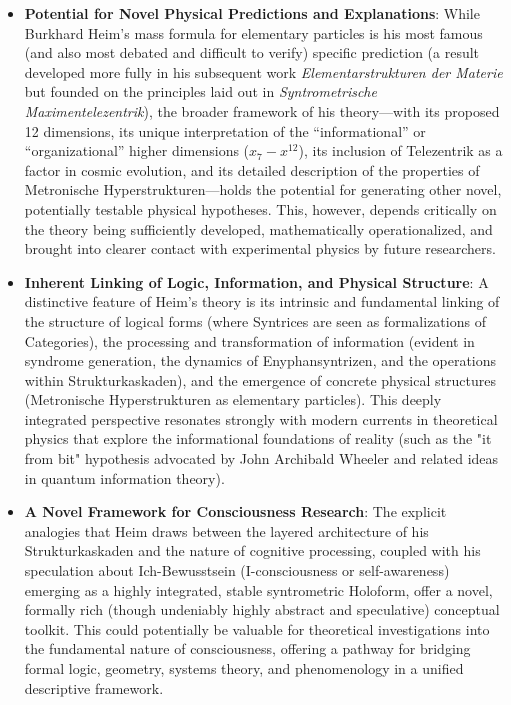 \documentclass[
    12pt,              %
    a4paper,           %
    headings=normal,   %
    twoside=true,      %
    BCOR=8mm,          %
]{scrbook}
\newcommand{\q}[1]{\enquote{#1}}
\begin{document}
\begin{itemize}
    \item \textbf{Potential for Novel Physical Predictions and Explanations}: While Burkhard Heim's mass formula for elementary particles is his most famous (and also most debated and difficult to verify) specific prediction (a result developed more fully in his subsequent work \textit{Elementarstrukturen der Materie} but founded on the principles laid out in \textit{Syntrometrische Maximentelezentrik}), the broader framework of his theory—with its proposed 12 dimensions, its unique interpretation of the \enquote{informational} or \q{organizational} higher dimensions (\( x_7-x^{12} \)), its inclusion of Telezentrik as a factor in cosmic evolution, and its detailed description of the properties of Metronische Hyperstrukturen—holds the potential for generating other novel, potentially testable physical hypotheses. This, however, depends critically on the theory being sufficiently developed, mathematically operationalized, and brought into clearer contact with experimental physics by future researchers.
    \item \textbf{Inherent Linking of Logic, Information, and Physical Structure}: A distinctive feature of Heim’s theory is its intrinsic and fundamental linking of the structure of logical forms (where Syntrices are seen as formalizations of Categories), the processing and transformation of information (evident in syndrome generation, the dynamics of Enyphansyntrizen, and the operations within Strukturkaskaden), and the emergence of concrete physical structures (Metronische Hyperstrukturen as elementary particles). This deeply integrated perspective resonates strongly with modern currents in theoretical physics that explore the informational foundations of reality (such as the "it from bit" hypothesis advocated by John Archibald Wheeler and related ideas in quantum information theory).
    \item \textbf{A Novel Framework for Consciousness Research}: The explicit analogies that Heim draws between the layered architecture of his Strukturkaskaden and the nature of cognitive processing, coupled with his speculation about Ich-Bewusstsein (I-consciousness or self-awareness) emerging as a highly integrated, stable syntrometric Holoform, offer a novel, formally rich (though undeniably highly abstract and speculative) conceptual toolkit. This could potentially be valuable for theoretical investigations into the fundamental nature of consciousness, offering a pathway for bridging formal logic, geometry, systems theory, and phenomenology in a unified descriptive framework.
\end{itemize}
\end{document}
